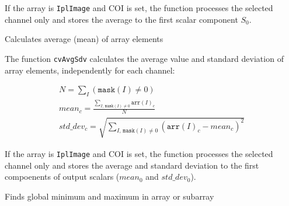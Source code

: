 If the array is \texttt{IplImage} and COI is set, the function processes the selected channel only and stores the average to the first scalar component $S_0$.


Calculates average (mean) of array elements


\begin{description}
\end{description}

The function \texttt{cvAvgSdv} calculates the average value and standard deviation of array elements, independently for each channel:

\[
\begin{array}{l}
N = \sum_I (\texttt{mask}(I) \ne 0)\\
mean_c = \frac{\sum_{ I, \, \texttt{mask}(I) \ne 0} \texttt{arr}(I)_c}{N}\\
std\_dev_c = \sqrt{\sum_{ I, \, \texttt{mask}(I) \ne 0} (\texttt{arr}(I)_c - mean_c)^2}
\end{array}
\]

If the array is \texttt{IplImage} and COI is set, the function processes the selected channel only and stores the average and standard deviation to the first compoenents of output scalars ($mean_0$ and $std\_dev_0$).


Finds global minimum and maximum in array or subarray


\begin{description}
\end{description}

